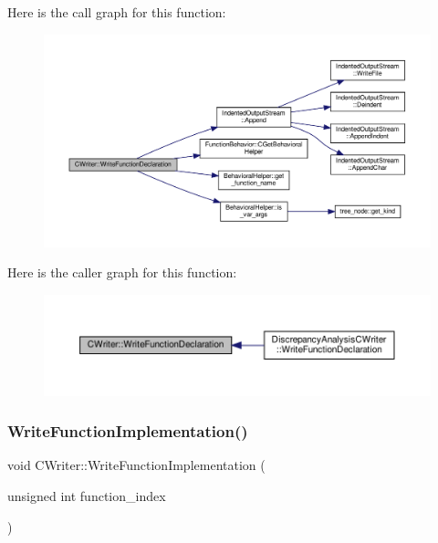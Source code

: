 Here is the call graph for this function\+:
\nopagebreak
\begin{figure}[H]
\begin{center}
\leavevmode
\includegraphics[width=350pt]{d3/d59/classCWriter_ad46d65f0cf64c09ce854032f15ffdd9e_cgraph}
\end{center}
\end{figure}
Here is the caller graph for this function\+:
\nopagebreak
\begin{figure}[H]
\begin{center}
\leavevmode
\includegraphics[width=350pt]{d3/d59/classCWriter_ad46d65f0cf64c09ce854032f15ffdd9e_icgraph}
\end{center}
\end{figure}
\mbox{\label{classCWriter_a3a050cfd9987eb7a7227865cf40db91d}} 
\subsubsection{\texorpdfstring{Write\+Function\+Implementation()}{WriteFunctionImplementation()}}
{\footnotesize\ttfamily void C\+Writer\+::\+Write\+Function\+Implementation (\begin{DoxyParamCaption}\item[{unsigned int}]{function\+\_\+index }\end{DoxyParamCaption})\hspace{0.3cm}{\ttfamily [virtual]}}



